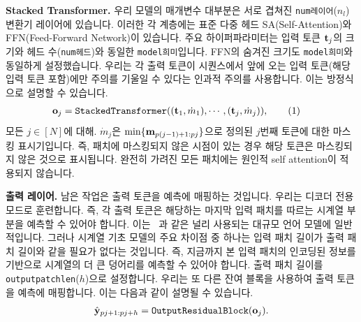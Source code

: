 \documentclass{article}
\newcommand\numberthis{\addtocounter{equation}{1}\tag{\theequation}}
\begin{document}
{\bf Stacked Transformer.} 우리 모델의 매개변수 대부분은 서로 겹쳐진 \texttt{num\textunderscore 레이어}($n_l$) 변환기 레이어에 있습니다. 이러한 각 계층에는 표준 다중 헤드 SA(Self-Attention)와 FFN(Feed-Forward Network)이 있습니다. 주요 하이퍼파라미터는 입력 토큰 $\mathbf{t}_j$의 크기와 헤드 수(\texttt{num\textunderscore 헤드})와 동일한 \texttt{model\textunderscore 희미}입니다. FFN의 숨겨진 크기도 \texttt{model\textunderscore 희미}와 동일하게 설정했습니다. 우리는 각 출력 토큰이 시퀀스에서 앞에 오는 입력 토큰(해당 입력 토큰 포함)에만 주의를 기울일 수 있다는 인과적 주의를 사용합니다. 이는 방정식으로 설명할 수 있습니다.
\begin{align*}
    \*o_j = \texttt{StackedTransformer} ((\*t_1,\dot{m}_1), & \cdots, (\*t_{j},  \dot{m}_j ) ), \numberthis \label{eq:stacked}
\end{align*}
모든 $j \in [N]$에 대해. $\dot{m}_j$은 $\min\{\mathbf{m}_{p(j-1)+1:pj}\}$으로 정의된 $j$번째 토큰에 대한 마스킹 표시기입니다. 즉, 패치에 마스킹되지 않은 시점이 있는 경우 해당 토큰은 마스킹되지 않은 것으로 표시됩니다. 완전히 가려진 모든 패치에는 원인적 self attention이 적용되지 않습니다.


{\bf 출력 레이어.} 남은 작업은 출력 토큰을 예측에 매핑하는 것입니다. 우리는 디코더 전용 모드로 훈련합니다. 즉, 각 출력 토큰은 해당하는 마지막 입력 패치를 따르는 시계열 부분을 예측할 수 있어야 합니다. 이는 ~\citep{radford2019language}과 같은 널리 사용되는 대규모 언어 모델에 일반적입니다. 그러나 시계열 기초 모델의 주요 차이점 중 하나는 입력 패치 길이가 출력 패치 길이와 같을 필요가 없다는 것입니다. 즉, 지금까지 본 입력 패치의 인코딩된 정보를 기반으로 시계열의 더 큰 덩어리를 예측할 수 있어야 합니다. 출력 패치 길이를 \texttt{output\textunderscore patch\textunderscore len}($h$)으로 설정합니다. 우리는 또 다른 잔여 블록을 사용하여 출력 토큰을 예측에 매핑합니다. 이는 다음과 같이 설명될 수 있습니다.
\begin{align}
    \hat{\*y}_{pj+1: pj + h} = \texttt{OutputResidualBlock} \left( \*o_j \right). \label{eq:output}
\end{align}
\end{document}
